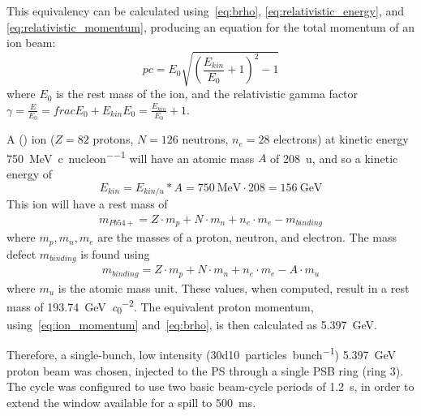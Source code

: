 \documentclass[11pt]{report}
\begin{document}
This equivalency can be calculated using~\autoref{eq:brho}, \autoref{eq:relativistic_energy}, and \autoref{eq:relativistic_momentum}, producing an equation for the total momentum of an ion beam:
\begin{equation}
  pc=E_0\sqrt{\left(\frac{E_{kin}}{E_0}+1\right)^2-1}
  \label{eq:ion_momentum}
\end{equation} where $E_0$ is the rest mass of the ion, and the relativistic gamma factor $\gamma = \frac E{E_0}=frac{E_0+E_{kin}}{E_0}=\frac{E_{kin}}{E_0}+1$.

A () ion ($Z=82$ protons, $N=126$ neutrons, $n_e=28$ electrons) at kinetic energy \qty[per-mode=symbol]{750}{\mega\electronvolt\per~c\per nucleon} will have an atomic mass $A$ of \qty{208}{\atomicmassunit}, and so a kinetic energy of 
\begin{equation}
  E_{kin}=E_{kin/u}*A=\qty{750}{\mega\electronvolt}\cdot 208=\qty{156}{\giga\electronvolt}
\end{equation}
This ion will have a rest mass of
\begin{eqnarray}
  m_{Pb54+}= Z\cdot m_p + N\cdot m_n + n_e\cdot m_e - m_{binding}
\end{eqnarray} where $m_p, m_n, m_e$ are the masses of a proton, neutron, and electron. The mass defect $m_{binding}$ is found using
\begin{eqnarray}
  m_{binding}=Z\cdot m_p + N\cdot m_n + n_e\cdot m_e - A\cdot m_u
\end{eqnarray} where $m_u$ is the atomic mass unit. 
These values, when computed, result in a rest  mass of \qty{193.74}{\giga\electronvolt\per\clight\squared}. The equivalent proton momentum, using~\autoref{eq:ion_momentum} and~\autoref{eq:brho}, is then calculated as \qty{5.397}{\giga\electronvolt}. 

Therefore, a single-bunch, low intensity (\qty[per-mode=symbol]{30d10}{particles\per bunch}) \qty{5.397}{\giga\electronvolt} proton beam was chosen, injected to the PS through a single PSB ring (ring 3). The cycle was configured to use two basic beam-cycle periods of \qty{1.2}{\second}, in order to extend the window available for a spill to \qty{500}{\milli\second}.
\end{document}
